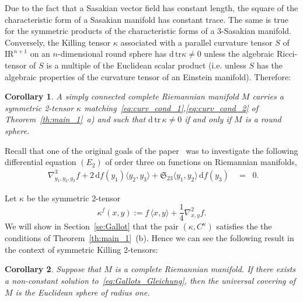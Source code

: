 \documentclass[11pt,a4paper]{article}
\theoremstyle{plain}
\newtheorem{corollary}{Corollary}
\theoremstyle{remark}
\newcommand{\cyclic}{\mathfrak{S}}
\newcommand{\R}{\mathrm{I\!R}}
\renewcommand{\d}{\mathrm{d}}
\newcommand{\trace}{\mathrm{tr}}
\begin{document}
Due to the fact that a Sasakian vector field has constant length, 
the square of the characteristic form of a Sasakian manifold has
constant trace. The same is true for the symmetric products of the characteristic forms of a
3-Sasakian manifold. Conversely, the Killing tensor $\kappa$ associated with a
parallel curvature tensor $S$ of $\R^{n+1}$ on an $n$-dimensional round sphere has $\d\, \trace
\kappa \neq 0$ unless the algebraic Ricci-tensor of $S$ is a multiple of
the Euclidean scalar product (i.e. unless $S$ has the algebraic
properties of the curvature tensor of an Einstein manifold). Therefore:  


\bigskip
\begin{corollary}\label{co:main_2}
A simply connected complete Riemannian manifold $M$ carries a symmetric 2-tensor $\kappa$ matching~\eqref{eq:curv_cond_1},\eqref{eq:curv_cond_2} of Theorem~\ref{th:main_1}~a)
and such that $\d\, \trace \, \kappa \neq 0$ if and only if $M$ is a
round sphere.
\end{corollary}

Recall that one of the original goals of the paper~\cite{Ga} was to investigate the following differential
equation $(E_2)$ of order three on functions on Riemannian manifolds,
\begin{equation}\label{eq:Gallots_Gleichung}
\left . \begin{array}{c} \nabla^3_{y_1,y_2,y_3}f  +
    2\,\d f(y_1) \langle y_2,y_3\rangle  +
    \cyclic_{23}\langle y_1,y_2 \rangle\,
    \d f(y_3) \end{array} \right .\;\;=\;\;0.
\end{equation}

Let $\kappa$ be the symmetric 2-tensor 
\begin{equation}\label{eq:Gallots_kappa}
\kappa^f(x,y) := f\,\langle x ,y \rangle + \frac{1}{4} \nabla^2_{x,y} f.
\end{equation}
We will show in Section~\ref{se:Gallot} that the pair $(\kappa,C^\kappa)$ satisfies the the conditions of Theorem~\ref{th:main_1}~(b). Hence we can see the following result in the
context of symmetric Killing 2-tensors:

\bigskip
\begin{corollary}\label{co:Gallot}{\cite[Corollary~3.3]{Ga}}
Suppose that $M$ is a complete Riemannian manifold. 
If there exists a non-constant solution to~\eqref{eq:Gallots_Gleichung}, 
then the universal covering of $M$ is the Euclidean sphere of radius one.
\end{corollary}
\end{document}

